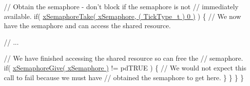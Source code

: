 \begin{DoxyPre}       // Obtain the semaphore - don't block if the semaphore is not
       // immediately available.
       if( \hyperlink{vendor_2ceedling_2plugins_2freertos_2src_2freertos_2include_2semphr_8h_af116e436d2a5ae5bd72dbade2b5ea930}{xSemaphoreTake( xSemaphore, ( TickType\_t ) 0 )} )
       \{
           // We now have the semaphore and can access the shared resource.\end{DoxyPre}



\begin{DoxyPre}           // ...\end{DoxyPre}



\begin{DoxyPre}           // We have finished accessing the shared resource so can free the
           // semaphore.
           if( \hyperlink{vendor_2ceedling_2plugins_2freertos_2src_2freertos_2include_2semphr_8h_aae55761cabfa9bf85c8f4430f78c0953}{xSemaphoreGive( xSemaphore )} != pdTRUE )
           \{
               // We would not expect this call to fail because we must have
               // obtained the semaphore to get here.
           \}
       \}
   \}
\}
\end{DoxyPre}
 
